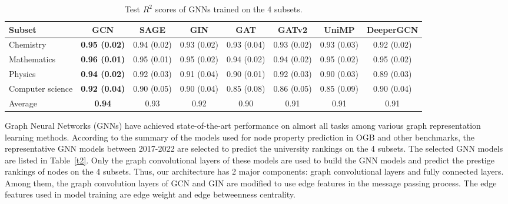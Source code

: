 \documentclass[journal]{IEEEtran}
\begin{document}
\begin{table}[htbp]
\caption{Test $R^2$ scores of GNNs trained on the 4 subsets.}
\begin{center}
\begin{tabular}{lccccccc }
\hline
\textbf{Subset} & \textbf{GCN} & \textbf{SAGE} & \textbf{GIN} & \textbf{GAT} & \textbf{GATv2} & \textbf{UniMP} & \textbf{DeeperGCN}  \\
\hline
Chemistry  &  \textbf{0.95 (0.02)}  &  0.94 (0.02)  &  0.93 (0.02) & 0.93 (0.04) & 0.93 (0.02) & 0.93 (0.03) 
 & 0.92 (0.02) \\
Mathematics  &  \textbf{0.96 (0.01)} & 0.95 (0.01)  &  0.95 (0.02) & 0.94 (0.02) & 0.94 (0.02) & 0.95 (0.02)  
 & 0.95 (0.02) \\
Physics  & \textbf{0.94 (0.02)}  & 0.92 (0.03)  &  0.91 (0.04) & 0.90 (0.01) & 0.92 (0.03) & 0.90 (0.03) & 0.89 (0.03) \\
Computer science  & \textbf{0.92 (0.04)}  & 0.90 (0.05)  &  0.90 (0.04) & 0.85 (0.08) & 0.86 (0.05) & 0.85 (0.09) & 0.90 (0.04) \\
\hline
Average & \textbf{0.94} & 0.93 & 0.92 & 0.90 & 0.91 & 0.91 & 0.91 \\
\hline
\end{tabular}
\label{t3}
\end{center}
\end{table}

Graph Neural Networks (GNNs) have achieved state-of-the-art performance on almost all tasks among various graph representation learning methods. According to the summary of the models used for node property prediction in OGB and other benchmarks, the representative GNN models between 2017-2022 are selected to predict the university rankings on the 4 subsets. The selected GNN models are listed in Table~\ref{t2}. Only the graph convolutional layers of these models are used to build the GNN models and predict the prestige rankings of  nodes on the 4 subsets. Thus, our architecture has 2 major components: graph convolutional layers and fully connected layers. Among them, the graph convolution layers of GCN and GIN are modified to use edge features in the message passing process. The edge features used in model training are edge weight and edge betweenness centrality.
\end{document}
